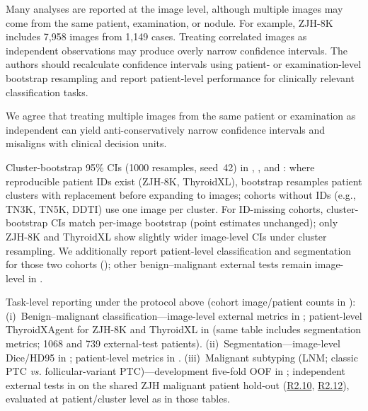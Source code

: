 \label{rev:R2.2}
\begin{reviewercomment}
Many analyses are reported at the image level, although multiple images may come from the same patient, examination, or nodule. For example, ZJH-8K includes 7,958 images from 1,149 cases. Treating correlated images as independent observations may produce overly narrow confidence intervals. The authors should recalculate confidence intervals using patient- or examination-level bootstrap resampling and report patient-level performance for clinically relevant classification tasks.
\end{reviewercomment}
\begin{authorresponse}
We agree that treating multiple images from the same patient or examination as independent can yield anti-conservatively narrow confidence intervals and misaligns with clinical decision units.\par
Cluster-bootstrap 95\% CIs (1000 resamples, seed~42) in , , and : where reproducible patient IDs exist (ZJH-8K, ThyroidXL), bootstrap resamples patient clusters with replacement before expanding to images; cohorts without IDs (e.g., TN3K, TN5K, DDTI) use one image per cluster. For ID-missing cohorts, cluster-bootstrap CIs match per-image bootstrap (point estimates unchanged); only ZJH-8K and ThyroidXL show slightly wider image-level CIs under cluster resampling. We additionally report patient-level classification and segmentation for those two cohorts (); other benign--malignant external tests remain image-level in .\par
Task-level reporting under the protocol above (cohort image/patient counts in ): (i)~Benign--malignant classification---image-level external metrics in ; patient-level ThyroidXAgent for ZJH-8K and ThyroidXL in  (same table includes segmentation metrics; 1068 and 739 external-test patients). (ii)~Segmentation---image-level Dice/HD95 in ; patient-level metrics in . (iii)~Malignant subtyping (LNM; classic PTC \emph{vs.} follicular-variant PTC)---development five-fold OOF in ; independent external tests in  on the shared ZJH malignant patient hold-out (\hyperref[rev:R2.10]{R2.10}, \hyperref[rev:R2.12]{R2.12}), evaluated at patient/cluster level as in those tables.\par
\noindent\par
\par
\end{authorresponse}

